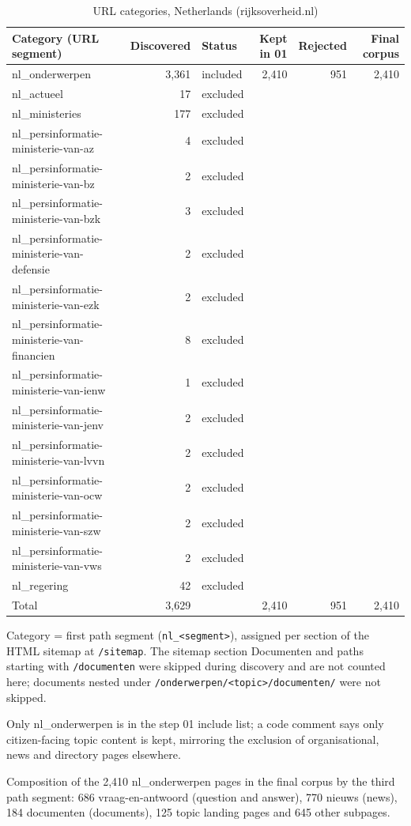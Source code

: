 \begin{table}[htbp]
\centering
\small
\begin{threeparttable}
\caption{URL categories, Netherlands (rijksoverheid.nl)}
\label{tab:dc_categories_netherlands}
\begin{tabular}{lrlrrr}
\hline
Category (URL segment) & Discovered & Status & Kept in 01 & Rejected & Final corpus \\
\hline
nl\_onderwerpen & 3,361 & included & 2,410 & 951 & 2,410 \\
nl\_actueel & 17 & excluded &  &  &  \\
nl\_ministeries & 177 & excluded &  &  &  \\
nl\_persinformatie-ministerie-van-az & 4 & excluded &  &  &  \\
nl\_persinformatie-ministerie-van-bz & 2 & excluded &  &  &  \\
nl\_persinformatie-ministerie-van-bzk & 3 & excluded &  &  &  \\
nl\_persinformatie-ministerie-van-defensie & 2 & excluded &  &  &  \\
nl\_persinformatie-ministerie-van-ezk & 2 & excluded &  &  &  \\
nl\_persinformatie-ministerie-van-financien & 8 & excluded &  &  &  \\
nl\_persinformatie-ministerie-van-ienw & 1 & excluded &  &  &  \\
nl\_persinformatie-ministerie-van-jenv & 2 & excluded &  &  &  \\
nl\_persinformatie-ministerie-van-lvvn & 2 & excluded &  &  &  \\
nl\_persinformatie-ministerie-van-ocw & 2 & excluded &  &  &  \\
nl\_persinformatie-ministerie-van-szw & 2 & excluded &  &  &  \\
nl\_persinformatie-ministerie-van-vws & 2 & excluded &  &  &  \\
nl\_regering & 42 & excluded &  &  &  \\
\hline
Total & 3,629 &  & 2,410 & 951 & 2,410 \\
\hline
\end{tabular}
\begin{tablenotes}
\footnotesize
\item Category = first path segment (\texttt{nl\_<segment>}), assigned per section of the HTML sitemap at \texttt{/sitemap}. The sitemap section Documenten and paths starting with \texttt{/documenten} were skipped during discovery and are not counted here; documents nested under \texttt{/onderwerpen/<topic>/documenten/} were not skipped.
\item Only nl\_onderwerpen is in the step 01 include list; a code comment says only citizen-facing topic content is kept, mirroring the exclusion of organisational, news and directory pages elsewhere.
\item Composition of the 2,410 nl\_onderwerpen pages in the final corpus by the third path segment: 686 vraag-en-antwoord (question and answer), 770 nieuws (news), 184 documenten (documents), 125 topic landing pages and 645 other subpages.
\end{tablenotes}
\end{threeparttable}
\end{table}
